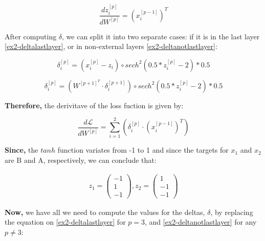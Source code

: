 \documentclass[12pt]{article}
\begin{document}
\begin{enumerate}[leftmargin=\labelsep]
          \begin{equation*}
            \frac{dz^{[p]}_i}{dW^{[p]}} = (x^{[p-1]}_i)^{T} 
          \end{equation*}
          
          After computing \(\delta\), we can split it into two separate cases: if it is in the last layer \eqref{ex2-deltalastlayer}, or in non-external layers \eqref{ex2-deltanotlastlayer}:

          \begin{equation}\label{ex2-deltalastlayer}
            \delta^{[p]}_i = (x^{[p]}_i - z_i) \circ  sech^{2}(0.5*z^{[p]}_i - 2) * 0.5
          \end{equation}

          \begin{equation}\label{ex2-deltanotlastlayer}
            \delta^{[p]}_i = (W^{[p+1]^{T}} \cdot \delta^{[p+1]}_i) \circ  sech^{2}(0.5*z^{[p]}_i - 2) * 0.5
          \end{equation}

          \textbf{Therefore,} the derivitave of the loss fuction is given by:

          \begin{equation}\label{ex2-derivate-loss-smiplified}
            \frac{d\mathcal{L}}{dW^{[p]}} = \sum_{i=1}^{2} (\delta^{[p]}_i \cdot (x^{[p-1]}_i)^{T} )
          \end{equation}

          \textbf{Since,} the $tanh$ function variates from -1 to 1 and since the targets for $x_1$ and $x_2$ are B and A, respectively, we can conclude that:

          \begin{align*}
            z_1 = \begin{pmatrix} -1 \\ 1 \\ -1\end{pmatrix}, z_2 = \begin{pmatrix} 1 \\ -1 \\ -1\end{pmatrix} 
          \end{align*}
          
          \textbf{Now,} we have all we need to compute the values for the deltas, $\delta$, by replacing the equation on \ref{ex2-deltalastlayer} for $p=3$, and \ref{ex2-deltanotlastlayer} for any $p \neq 3$:


\end{enumerate}
\end{document}
